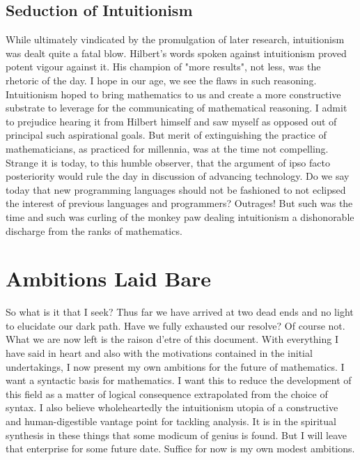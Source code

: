 \subsection{Seduction of Intuitionism}
While ultimately vindicated by the promulgation of later research, intuitionism
was dealt quite a fatal blow. Hilbert's words spoken against intuitionism
proved potent vigour against it. His champion of "more results", not less, was
the rhetoric of the day. I hope in our age, we see the flaws in such reasoning.
Intuitionism hoped to bring mathematics to us and create a more constructive
substrate to leverage for the communicating of mathematical reasoning. I admit
to prejudice hearing it from Hilbert himself and saw myself as opposed out of
principal such aspirational goals. But merit of extinguishing the practice of
mathematicians, as practiced for millennia, was at the time not compelling.
Strange it is today, to this humble observer, that the argument of ipso facto
posteriority would rule the day in discussion of advancing technology. Do we
say today that new programming languages should not be fashioned to not
eclipsed the interest of previous languages and programmers? Outrages! But such
was the time and such was curling of the monkey paw dealing intuitionism a
dishonorable discharge from the ranks of mathematics.

\section{Ambitions Laid Bare}
So what is it that I seek? Thus far we have arrived at two dead ends and no
light to elucidate our dark path. Have we fully exhausted our resolve? Of
course not. What we are now left is the raison d'etre of this document. With
everything I have said in heart and also with the motivations contained in the
initial undertakings, I now present my own ambitions for the future of
mathematics. I want a syntactic basis for mathematics. I want this to reduce
the development of this field as a matter of logical consequence extrapolated
from the choice of syntax. I also believe wholeheartedly the intuitionism
utopia of a constructive and human-digestible vantage point for tackling
analysis. It is in the spiritual synthesis in these things that some modicum of
genius is found. But I will leave that enterprise for some future date. Suffice
for now is my own modest ambitions.


